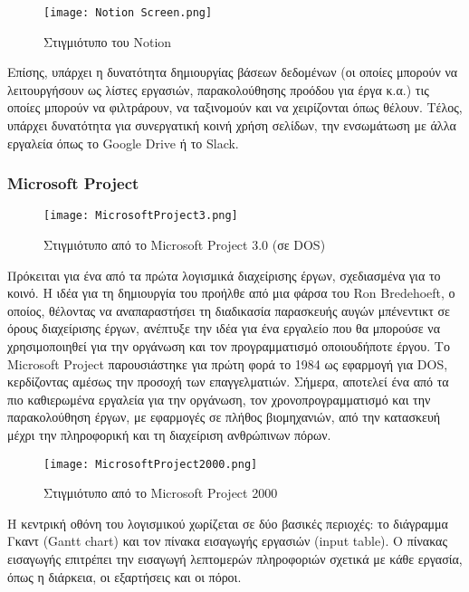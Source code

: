                 \begin{figure}[h!] \noindent \centering
                    \texttt{[image: Notion Screen.png]}
                    \caption{\centering Στιγμιότυπο του Notion}
                \end{figure}

                Επίσης, υπάρχει η δυνατότητα δημιουργίας βάσεων δεδομένων (οι οποίες μπορούν να λειτουργήσουν ως λίστες εργασιών, παρακολούθησης προόδου για έργα κ.α.) τις οποίες μπορούν να φιλτράρουν, να ταξινομούν και να χειρίζονται όπως θέλουν. Τέλος, υπάρχει δυνατότητα για συνεργατική κοινή χρήση σελίδων, την ενσωμάτωση με άλλα εργαλεία όπως το Google Drive ή το Slack.

            \subsubsection{Microsoft Project}
                \begin{figure}[h!] \noindent \centering
                    \texttt{[image: MicrosoftProject3.png]}
                    \caption{\centering Στιγμιότυπο από το Microsoft Project 3.0 (σε DOS) \cite{WinWorld}}
                \end{figure}

                Πρόκειται για ένα από τα πρώτα λογισμικά διαχείρισης έργων, σχεδιασμένα για το κοινό. Η ιδέα για τη δημιουργία του προήλθε από μια φάρσα του Ron Bredehoeft, ο οποίος, θέλοντας να αναπαραστήσει τη διαδικασία παρασκευής αυγών μπένεντικτ σε όρους διαχείρισης έργων, ανέπτυξε την ιδέα για ένα εργαλείο που θα μπορούσε να χρησιμοποιηθεί για την οργάνωση και τον προγραμματισμό οποιουδήποτε έργου. Το Microsoft Project παρουσιάστηκε για πρώτη φορά το 1984 ως εφαρμογή για DOS, κερδίζοντας αμέσως την προσοχή των επαγγελματιών. Σήμερα, αποτελεί ένα από τα πιο καθιερωμένα εργαλεία για την οργάνωση, τον χρονοπρογραμματισμό και την παρακολούθηση έργων, με εφαρμογές σε πλήθος βιομηχανιών, από την κατασκευή μέχρι την πληροφορική και τη διαχείριση ανθρώπινων πόρων.

                \begin{figure}[h!] \noindent \centering
                    \texttt{[image: MicrosoftProject2000.png]}
                    \caption{\centering Στιγμιότυπο από το Microsoft Project 2000 \cite{WinWorld}}
                \end{figure}

                Η κεντρική οθόνη του λογισμικού χωρίζεται σε δύο βασικές περιοχές: το διάγραμμα Γκαντ (Gantt chart) και τον πίνακα εισαγωγής εργασιών (input table). Ο πίνακας εισαγωγής επιτρέπει την εισαγωγή λεπτομερών πληροφοριών σχετικά με κάθε εργασία, όπως η διάρκεια, οι εξαρτήσεις και οι πόροι.


